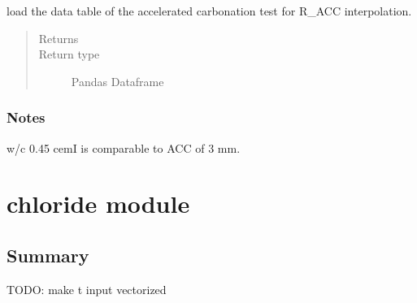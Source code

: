 \documentclass[letterpaper,10pt,english]{sphinxmanual}
\begin{document}

\begin{fulllineitems}
\label{\detokenize{carbonation:carbonation.load_df_R_ACC}}
\sphinxAtStartPar
load the data table of the accelerated carbonation test
for R\_ACC interpolation.
\begin{quote}\begin{description}
\item[{Returns}] \leavevmode
\sphinxAtStartPar


\item[{Return type}] \leavevmode
\sphinxAtStartPar
Pandas Dataframe

\end{description}\end{quote}
\subsubsection*{Notes}

\sphinxAtStartPar
w/c 0.45 cemI is comparable to ACC of 3 mm.

\end{fulllineitems}



\section{chloride module}
\label{\detokenize{chloride:module-chloride}}\label{\detokenize{chloride:chloride-module}}\label{\detokenize{chloride::doc}}

\subsection{Summary}
\label{\detokenize{chloride:summary}}
\sphinxAtStartPar
TODO: make t input vectorized
\end{document}
